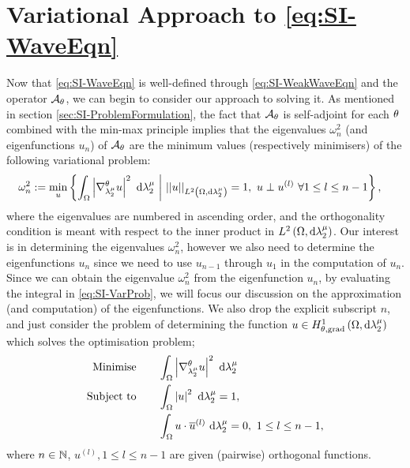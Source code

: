 \section{Variational Approach to \eqref{eq:SI-WaveEqn}} \label{sec:SI-VarProbMethod}
Now that \eqref{eq:SI-WaveEqn} is well-defined through \eqref{eq:SI-WeakWaveEqn} and the operator $\mathcal{A}_{\theta}$, we can begin to consider our approach to solving it.
As mentioned in section \ref{sec:SI-ProblemFormulation}, the fact that $\mathcal{A}_{\theta}$ is self-adjoint for each $\theta$ combined with the min-max principle implies that the eigenvalues $\omega_{n}^2$ (and eigenfunctions $u_n$) of $\mathcal{A}_{\theta}$ are the minimum values (respectively minimisers) of the following variational problem:
\begin{align} \label{eq:SI-VarProb}
	\omega_n^2 &:= \min_{u}\left\{  \int_{\Omega} \left\lvert \nabla^{\theta}_{\lambda_2^{\mu}}u \right\rvert^2  \ \mathrm{d}\lambda_2^{\mu} \ \middle\vert \  \lvert\lvert u \rvert\rvert_{L^{2}\left( \Omega,\mathrm{d} \lambda_2^{\mu} \right)}=1, \ u\perp u^{(l)} \ \forall 1\leq l\leq n-1  \right\},
\end{align} 
where the eigenvalues are numbered in ascending order, and the orthogonality condition is meant with respect to the inner product in $L^{2}\left( \Omega,\mathrm{d} \lambda_2^{\mu} \right)$.
Our interest is in determining the eigenvalues $\omega_n^2$, however we also need to determine the eigenfunctions $u_n$ since we need to use $u_{n-1}$ through $u_1$ in the computation of $u_{n}$.
Since we can obtain the eigenvalue $\omega_n^2$ from the eigenfunction $u_n$, by evaluating the integral in \eqref{eq:SI-VarProb}, we will focus our discussion on the approximation (and computation) of the eigenfunctions.
We also drop the explicit subscript $n$, and just consider the problem of determining the function $u\in H^1_{\theta, \mathrm{grad}}\left( \Omega, \mathrm{d}\lambda_2^{\mu} \right)$ which solves the optimisation problem;
\begin{subequations} \label{eq:SI-MinProblem}
	\begin{align}
		\text{Minimise} \quad & \quad \int_{\Omega} \left\lvert \nabla^{\theta}_{\lambda_2^{\mu}}u \right\rvert^2  \ \mathrm{d}\lambda_2^{\mu} \\
		\text{Subject to} \quad & \quad \int_{\Omega} \left\lvert u \right\rvert^2  \ \mathrm{d}\lambda_2^{\mu} = 1, \\
		& \quad \int_{\Omega} u\cdot\overline{u}^{(l)}  \ \mathrm{d}\lambda_2^{\mu} = 0, \ 1\leq l\leq n-1,
	\end{align}
\end{subequations}
where $n\in\mathbb{N}$, $u^{(l)}, 1\leq l\leq n-1$ are given (pairwise) orthogonal functions.

